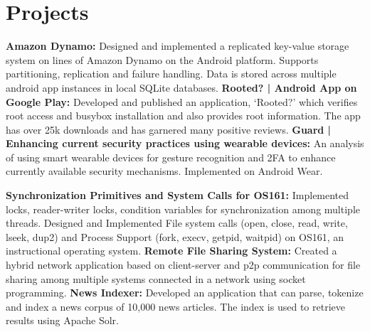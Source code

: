 \documentclass[11pt,a4paper,sans]{moderncv}        %
\begin{document}
\section{Projects}
{\textbf{Amazon Dynamo: }Designed and implemented a replicated key-value storage system on lines of Amazon Dynamo on the Android
platform. Supports partitioning, replication and failure handling. Data is stored across multiple android app instances
in local SQLite databases.}
\cvitem {}
{\textbf{Rooted? | Android App on Google Play: }Developed and published an application, ‘Rooted?’ which verifies root access and
busybox installation and also provides root information. The app has over 25k downloads and has garnered many positive reviews. }
\cvitem {}
{\textbf{Guard | Enhancing current security practices using wearable devices: }An analysis of using smart wearable devices for gesture recognition and 2FA to enhance currently available security mechanisms. Implemented on Android Wear.}

{\textbf{Synchronization Primitives and System Calls for OS161: }Implemented locks, reader-writer locks, condition variables for synchronization among multiple threads. Designed
and Implemented File system calls (open, close, read, write, lseek, dup2) and Process Support (fork, execv, getpid,
waitpid) on OS161, an instructional operating system.}
{\textbf{Remote File Sharing System: }Created a hybrid network application based on client-server and p2p communication for file sharing among multiple systems connected in a network using socket programming.}
{\textbf{News Indexer: }Developed an application that can parse, tokenize and index a news corpus of 10,000 news articles. The index is used to retrieve results using Apache Solr.}

\clearpage
\thispagestyle{empty}
\end{document}
